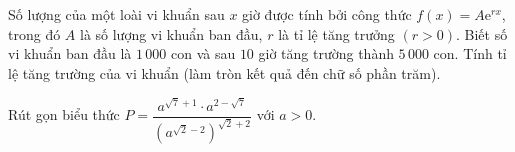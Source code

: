 \begin{bt}%
	Số lượng của một loài vi khuẩn sau $x$ giờ được tính bởi công thức $f(x)=A\mathrm{e}^{rx}$, trong đó
	$A$ là số lượng vi khuẩn ban đầu, $r$ là tỉ lệ tăng trưởng $(r>0)$. Biết số vi khuẩn ban đầu là $1\,000$
	con và sau $10$ giờ tăng trường thành $5\,000$ con. Tính tỉ lệ tăng trường của vi khuẩn (làm tròn kết quả đến
	chữ số phần trăm).
\end{bt}

\begin{bt}%
	Rút gọn biểu thức $P=\dfrac{a^{\sqrt{7}+1}\cdot a^{2-\sqrt{7}}}{\left(a^{\sqrt{2}-2}\right)^{\sqrt{2}+2}}$ với $a>0$.
\end{bt}

